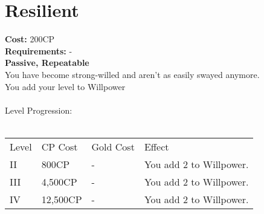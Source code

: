 \section{Resilient}\label{perk:resilient}
\textbf{Cost:} 200CP\\
\textbf{Requirements:} -\\
\textbf{Passive, Repeatable}\\
You have become strong-willed and aren't as easily swayed anymore.\\
You add your level to Willpower\\
\\
Level Progression:\\
\\
\begin{tabular}{l | l | l | l}
	Level & CP Cost & Gold Cost & Effect\\
	II & 800CP & - & You add 2 to Willpower.\\
	III & 4,500CP & - & You add 2 to Willpower.\\
	IV & 12,500CP & - & You add 2 to Willpower.\\
\end{tabular}
